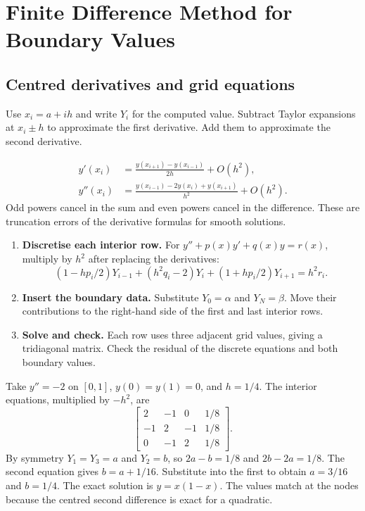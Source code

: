 \documentclass[12pt,a4paper]{article}
\begin{document}
\section{Finite Difference Method for Boundary Values}
\subsection{Centred derivatives and grid equations}
Use $x_i=a+ih$ and write $Y_i$ for the computed value. Subtract Taylor expansions at $x_i\pm h$ to approximate the first derivative. Add them to approximate the second derivative.
\begin{tcolorbox}[formulabox, title={Three-point centred formulas}]
\[
\begin{aligned}
y'(x_i)&=\frac{y(x_{i+1})-y(x_{i-1})}{2h}+O(h^2),\\
y''(x_i)&=\frac{y(x_{i-1})-2y(x_i)+y(x_{i+1})}{h^2}+O(h^2).
\end{aligned}
\]
Odd powers cancel in the sum and even powers cancel in the difference. These are truncation errors of the derivative formulas for smooth solutions.
\end{tcolorbox}

\begin{enumerate}[leftmargin=*, itemsep=3pt, topsep=4pt]
  \item \textbf{Discretise each interior row.} For $y''+p(x)y'+q(x)y=r(x)$, multiply by $h^2$ after replacing the derivatives:
 \[
 (1-hp_i/2)Y_{i-1}+(h^2q_i-2)Y_i+
       (1+hp_i/2)Y_{i+1}=h^2r_i.
 \]
  \item \textbf{Insert the boundary data.} Substitute $Y_0=\alpha$ and $Y_N=\beta$. Move their contributions to the right-hand side of the first and last interior rows.
  \item \textbf{Solve and check.} Each row uses three adjacent grid values, giving a tridiagonal matrix. Check the residual of the discrete equations and both boundary values.
\end{enumerate}
\begin{tcolorbox}[examplebox, title={Solve a boundary-value problem on a five-node grid}]
Take $y''=-2$ on $[0,1]$, $y(0)=y(1)=0$, and $h=1/4$. The interior equations, multiplied by $-h^2$, are
\[
\left[\begin{array}{rrr|r}
 2&-1&0&1/8\\
 -1&2&-1&1/8\\
 0&-1&2&1/8
\end{array}\right].
\]
By symmetry $Y_1=Y_3=a$ and $Y_2=b$, so $2a-b=1/8$ and $2b-2a=1/8$. The second equation gives $b=a+1/16$. Substitute into the first to obtain $a=3/16$ and $b=1/4$. The exact solution is $y=x(1-x)$. The values match at the nodes because the centred second difference is exact for a quadratic.
\end{tcolorbox}
\end{document}
